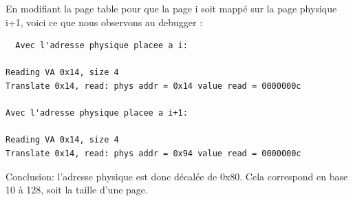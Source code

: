 \documentclass[a4paper,10pt]{article}
\begin{document}
En modifiant la page table pour que la page i soit mappé sur la page physique i+1, voici ce que nous observons au debugger :

\begin{verbatim}
  Avec l'adresse physique placee a i:

Reading VA 0x14, size 4
Translate 0x14, read: phys addr = 0x14 value read = 0000000c

Avec l'adresse physique placee a i+1:

Reading VA 0x14, size 4
Translate 0x14, read: phys addr = 0x94 value read = 0000000c
\end{verbatim}

\vspace{0.5cm}

Conclusion: l'adresse physique est donc décalée de 0x80. Cela correspond en base 10 à 128, soit la taille d'une page.
\end{document}
